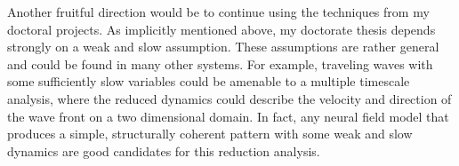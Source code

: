 \documentclass[a4paper,11pt]{article}
\begin{document}
Another fruitful direction would be to continue using the techniques from my doctoral projects. As implicitly mentioned above, my doctorate thesis depends strongly on a weak and slow assumption. These assumptions are rather general and could be found in many other systems. For example, traveling waves with some sufficiently slow variables could be amenable to a multiple timescale analysis, where the reduced dynamics could describe the velocity and direction of the wave front on a two dimensional domain. In fact, any neural field model that produces a simple, structurally coherent pattern with some weak and slow dynamics are good candidates for this reduction analysis.




\end{document}
